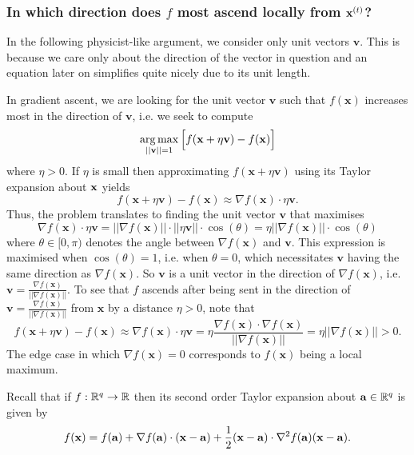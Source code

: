 \documentclass[11pt]{article}
\begin{document}
\subsubsection{In which direction does $f$ most ascend locally from $\mathbf{x}^{(t)}$?}
In the following physicist-like argument, we consider only unit vectors $\mathbf{v}$. This is because we care only about the direction of the vector in question and an equation later on simplifies quite nicely due to its unit length. 

In gradient ascent, we are looking for the unit vector $\mathbf{v}$ such that $f(\mathbf{x})$ increases most in the direction of $\mathbf{v}$, i.e. we seek to compute
$$\operatorname*{arg\,max}_{||\mathbf{v}||=1}\Big[f(\mathbf{x}+\eta\mathbf{v})-f(\mathbf{x})\Big]$$
where $\eta>0$. If $\eta$ is small then approximating $f(\mathbf{x}+\eta\mathbf{v})$ using its Taylor expansion about $\mathbf{x}$ yields
$$
f(\mathbf{x}+\eta\mathbf{v})-f(\mathbf{x})
\approx
\nabla f(\mathbf{x})\cdot\eta\mathbf{v}.
$$
Thus, the problem translates to finding the unit vector $\mathbf{v}$ that maximises
$$
\nabla f(\mathbf{x})\cdot\eta\mathbf{v}=||\nabla f(\mathbf{x})||\cdot||\eta\mathbf{v}||\cdot\cos(\theta)=\eta||\nabla f(\mathbf{x})||\cdot\cos(\theta)
$$
where $\theta\in[0,\pi)$ denotes the angle between $\nabla f(\mathbf{x})$ and $\mathbf{v}$. This expression is maximised when $\cos(\theta)=1$, i.e. when $\theta=0$, which necessitates $\mathbf{v}$ having the same direction as $\nabla f(\mathbf{x})$. So $\mathbf{v}$ is a unit vector in the direction of $\nabla f(\mathbf{x})$, i.e. $\mathbf{v}=\frac{\nabla f(\mathbf{x})}{||\nabla f(\mathbf{x})||}$. To see that $f$ ascends after being sent in the direction of $\mathbf{v}=\frac{\nabla f(\mathbf{x})}{||\nabla f(\mathbf{x})||}$ from $\mathbf{x}$ by a distance $\eta>0$, note that
$$
f(\mathbf{x}+\eta\mathbf{v})-f(\mathbf{x})
\approx
\nabla f(\mathbf{x})\cdot\eta\mathbf{v}
=
\eta\frac{\nabla f(\mathbf{x})\cdot\nabla f(\mathbf{x})}{||\nabla f(\mathbf{x})||}
=
\eta||\nabla f(\mathbf{x})||
>
0.
$$
The edge case in which $\nabla f(\mathbf{x})=0$ corresponds to $f(\mathbf{x})$ being a local maximum.

\begin{tcolorbox}[title={\centering\textbf{Multivariate Taylor expansion}}, colback=myLightBlue, colbacktitle=myDarkBlue, colframe=myDarkBlue, coltitle=white]
    Recall that if $f:\mathbb{R}^q\to\mathbb{R}$ then its second order Taylor expansion about $\mathbf{a}\in\mathbb{R}^q$ is given by
    $$
    f(\mathbf{x})
    =
    f(\mathbf{a})+\nabla f(\mathbf{a})\cdot(\mathbf{x}-\mathbf{a})+\frac{1}{2}(\mathbf{x}-\mathbf{a})\cdot\nabla^2 f(\mathbf{a})(\mathbf{x}-\mathbf{a}).
    $$
\end{tcolorbox}
\end{document}
